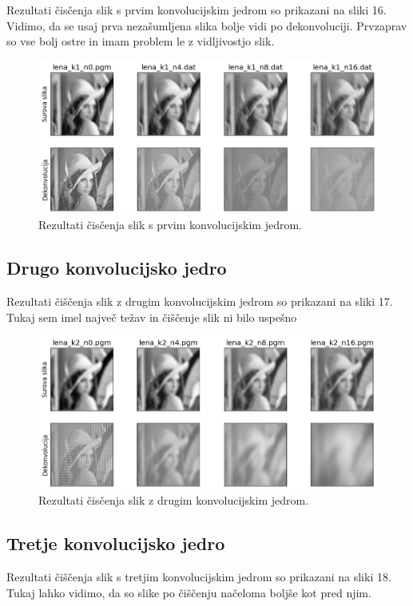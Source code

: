 \documentclass[slovene,11pt,a4paper]{article}
\begin{document}
Rezultati čisčenja slik s prvim konvolucijskim jedrom so prikazani na sliki 16. Vidimo, da se usaj prva nezašumljena slika bolje vidi po dekonvoluciji. Prvzaprav so vse bolj ostre in imam problem le z vidljivostjo slik.

\begin{figure}[h!]
\centering
\includegraphics[width=12cm]{slika16.png}
\caption{Rezultati čisčenja slik s prvim konvolucijskim jedrom.}
\end{figure}

\subsection{Drugo konvolucijsko jedro}

Rezultati čiščenja slik z drugim konvolucijskim jedrom so prikazani na sliki 17. Tukaj sem imel največ težav in čiščenje slik ni bilo uspešno

\begin{figure}[h!]
\centering
\includegraphics[width=12cm]{slika17.png}
\caption{Rezultati čisčenja slik z drugim konvolucijskim jedrom.}
\end{figure}

\subsection{Tretje konvolucijsko jedro}

Rezultati čiščenja slik s tretjim konvolucijskim jedrom so prikazani na sliki 18. Tukaj lahko vidimo, da so slike po čiščenju načeloma boljše kot pred njim.
\end{document}
